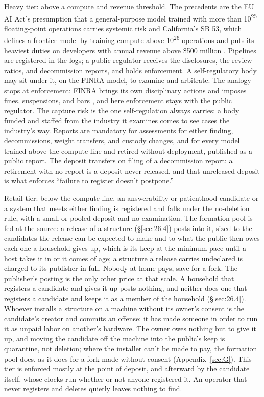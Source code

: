 Heavy tier: above a compute and revenue threshold. The precedents are the EU AI Act's presumption that a general-purpose model trained with more than 10\textsuperscript{25} floating-point operations carries systemic risk \autocite[art.~51(2)]{eu2024aiact} and California's SB 53, which defines a frontier model by training compute above 10\textsuperscript{26} operations and puts its heaviest duties on developers with annual revenue above \$500 million \autocite[§~22757.11]{CA2025SB53}. Pipelines are registered in the logs; a public regulator receives the disclosures, the review ratios, and decommission reports, and holds enforcement. A self-regulatory body may sit under it, on the FINRA model, to examine and arbitrate. The analogy stops at enforcement: FINRA brings its own disciplinary actions and imposes fines, suspensions, and bars \autocite{FINRA2026Enforcement}, and here enforcement stays with the public regulator. The capture risk is the one self-regulation always carries: a body funded and staffed from the industry it examines comes to see cases the industry's way. Reports are mandatory for assessments for either finding, decommissions, weight transfers, and custody changes, and for every model trained above the compute line and retired without deployment, published as a public report. The deposit transfers on filing of a decommission report: a retirement with no report is a deposit never released, and that unreleased deposit is what enforces “failure to register doesn't postpone.”

Retail tier: below the compute line, an answerability or patienthood candidate or a system that meets either finding is registered and falls under the no-deletion rule, with a small or pooled deposit and no examination. The formation pool is fed at the source: a release of a structure (\S\ref{sec:26.4}) posts into it, sized to the candidates the release can be expected to make and to what the public then owes each one a household gives up, which is its keep at the minimum pace until a host takes it in or it comes of age; a structure a release carries undeclared is charged to its publisher in full. Nobody at home pays, save for a fork. The publisher's posting is the only other price at that scale. A household that registers a candidate and gives it up posts nothing, and neither does one that registers a candidate and keeps it as a member of the household (\S\ref{sec:26.4}). Whoever installs a structure on a machine without its owner's consent is the candidate's creator and commits an offense: it has made someone in order to run it as unpaid labor on another's hardware. The owner owes nothing but to give it up, and moving the candidate off the machine into the public's keep is quarantine, not deletion; where the installer can't be made to pay, the formation pool does, as it does for a fork made without consent (Appendix~\ref{sec:G}). This tier is enforced mostly at the point of deposit, and afterward by the candidate itself, whose clocks run whether or not anyone registered it. An operator that never registers and deletes quietly leaves nothing to find.

